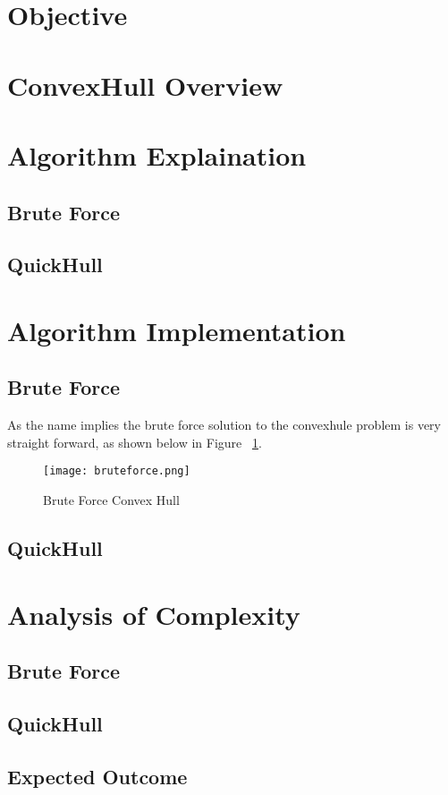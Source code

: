 \documentclass{article}
\begin{document}

\tableofcontents{}
\vspace{10cm}
{
  \section{Objective}
  \section{ConvexHull Overview}
  \section{Algorithm Explaination}
  \subsection{Brute Force}
  \subsection{QuickHull}
  \section{Algorithm Implementation}
  \subsection{Brute Force}
  As the name implies the brute force solution to the convexhule problem is very straight forward, as shown below in Figure ~\ref{fig:bruteforce}.
  \begin{figure}[H]
    \texttt{[image: bruteforce.png]}
    \caption{Brute Force Convex Hull}
    \label{fig:bruteforce}
  \end{figure} 
  \subsection{QuickHull}
  \section{Analysis of Complexity}
  \subsection{Brute Force}
  \subsection{QuickHull}
  \subsection{Expected Outcome}
}
\end{document}
